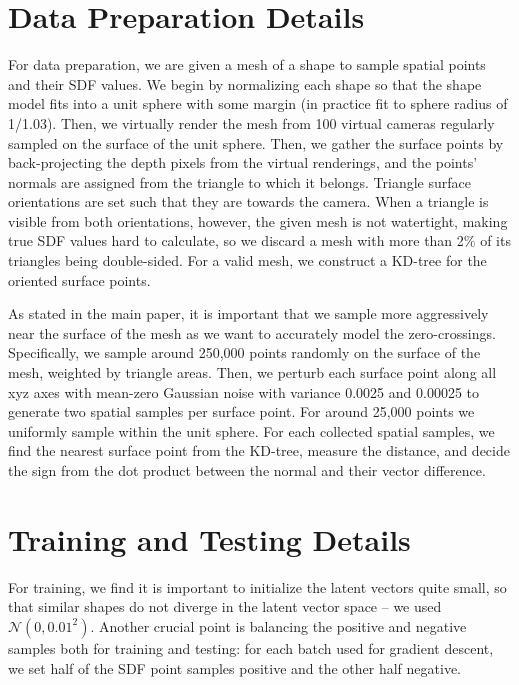 \documentclass[10pt,twocolumn,letterpaper]{article}
\begin{document}
\section{Data Preparation Details}\label{sec: data-prep}
For data preparation, we are given a mesh of a shape to sample spatial points and their SDF values. We begin by normalizing each shape so that the shape model fits into a unit sphere with some margin (in practice fit to sphere radius of 1/1.03). Then, we virtually render the mesh from 100 virtual cameras regularly sampled on the surface of the unit sphere. Then, we gather the surface points by back-projecting the depth pixels from the virtual renderings, and the points' normals are assigned from the triangle to which it belongs. Triangle surface orientations are set such that they are towards the camera. When a triangle is visible from both orientations, however, the given mesh is not watertight, making true SDF values hard to calculate, so we discard a mesh with more than 2\% of its triangles being double-sided. For a valid mesh, we construct a KD-tree for the oriented surface points.

As stated in the main paper, it is important that we sample more aggressively near the surface of the mesh as we want to accurately model the zero-crossings. Specifically, we sample around 250,000 points randomly on the surface of the mesh, weighted by triangle areas. Then, we perturb each surface point along all xyz axes with mean-zero Gaussian noise with variance 0.0025 and 0.00025 to generate two spatial samples per surface point. For around 25,000 points we uniformly sample within the unit sphere. For each collected spatial samples, we find the nearest surface point from the KD-tree, measure the distance, and decide the sign from the dot product between the normal and their vector difference.

\section{Training and Testing Details}\label{sec: training-testing}

For training, we find it is important to initialize the latent vectors quite small, so that similar shapes do not diverge in the latent vector space -- we used $\mathcal{N}(0,0.01^2)$. Another crucial point is balancing the positive and negative samples both for training and testing: for each batch used for gradient descent, we set half of the SDF point samples positive and the other half negative.
\end{document}
